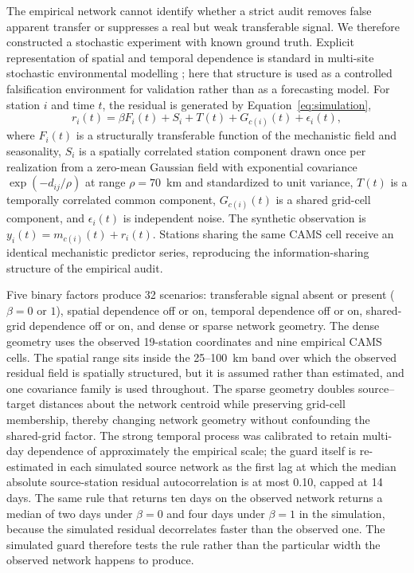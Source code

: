 The empirical network cannot identify whether a strict audit removes false apparent transfer or suppresses a real but weak transferable signal. We therefore constructed a stochastic experiment with known ground truth. Explicit representation of spatial and temporal dependence is standard in multi-site stochastic environmental modelling \citep{chida2025}; here that structure is used as a controlled falsification environment for validation rather than as a forecasting model. For station $i$ and time $t$, the residual is generated by Equation~\eqref{eq:simulation},
\begin{equation}
 r_i(t)=\beta F_i(t)+S_i+T(t)+G_{c(i)}(t)+\epsilon_i(t),
 \label{eq:simulation}
\end{equation}
where $F_i(t)$ is a structurally transferable function of the mechanistic field and seasonality, $S_i$ is a spatially correlated station component drawn once per realization from a zero-mean Gaussian field with exponential covariance $\exp(-d_{ij}/\rho)$ at range $\rho=70$~km and standardized to unit variance, $T(t)$ is a temporally correlated common component, $G_{c(i)}(t)$ is a shared grid-cell component, and $\epsilon_i(t)$ is independent noise. The synthetic observation is $y_i(t)=m_{c(i)}(t)+r_i(t)$. Stations sharing the same CAMS cell receive an identical mechanistic predictor series, reproducing the information-sharing structure of the empirical audit.

Five binary factors produce 32 scenarios: transferable signal absent or present ($\beta=0$ or $1$), spatial dependence off or on, temporal dependence off or on, shared-grid dependence off or on, and dense or sparse network geometry. The dense geometry uses the observed 19-station coordinates and nine empirical CAMS cells. The spatial range sits inside the 25--100~km band over which the observed residual field is spatially structured, but it is assumed rather than estimated, and one covariance family is used throughout. The sparse geometry doubles source--target distances about the network centroid while preserving grid-cell membership, thereby changing network geometry without confounding the shared-grid factor. The strong temporal process was calibrated to retain multi-day dependence of approximately the empirical scale; the guard itself is re-estimated in each simulated source network as the first lag at which the median absolute source-station residual autocorrelation is at most 0.10, capped at 14 days. The same rule that returns ten days on the observed network returns a median of two days under $\beta=0$ and four days under $\beta=1$ in the simulation, because the simulated residual decorrelates faster than the observed one. The simulated guard therefore tests the rule rather than the particular width the observed network happens to produce.


